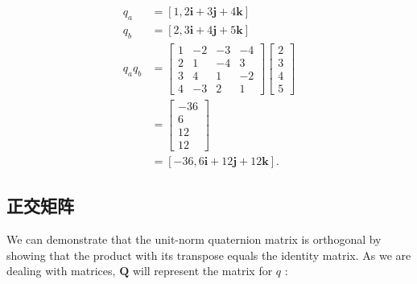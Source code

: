 $$
\begin{aligned}
q_{a} & =[1,2 \mathbf{i}+3 \mathbf{j}+4 \mathbf{k}] \\
q_{b} & =[2,3 \mathbf{i}+4 \mathbf{j}+5 \mathbf{k}] \\
q_{a} q_{b} & =\left[\begin{array}{cccc}
1 & -2 & -3 & -4 \\
2 & 1 & -4 & 3 \\
3 & 4 & 1 & -2 \\
4 & -3 & 2 & 1
\end{array}\right]\left[\begin{array}{l}
2 \\
3 \\
4 \\
5
\end{array}\right] \\
& =\left[\begin{array}{c}
-36 \\
6 \\
12 \\
12
\end{array}\right] \\
& =[-36,6 \mathbf{i}+12 \mathbf{j}+12 \mathbf{k}] .
\end{aligned}
$$

\subsection{正交矩阵}
We can demonstrate that the unit-norm quaternion matrix is orthogonal by showing that the product with its transpose equals the identity matrix. As we are dealing with matrices, $\mathbf{Q}$ will represent the matrix for $q$ :

